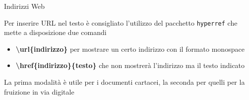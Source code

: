 \begin{frame}{Indirizzi Web}

Per inserire URL nel testo è consigliato l'utilizzo del pacchetto 
\texttt{hyperref} che mette a disposizione due comandi 
\begin{itemize}
	\item \textbf{\textbackslash{}url\{indirizzo\}} per mostrare un certo
	indirizzo con il formato monospace
	\item \textbf{\textbackslash{}href\{indirizzo\}\{testo\}} che non mostrerà
	l'indirizzo ma il testo indicato
\end{itemize}

\vfill

La prima modalità è utile per i documenti cartacei, la seconda per quelli per
la fruizione in via digitale

\end{frame}